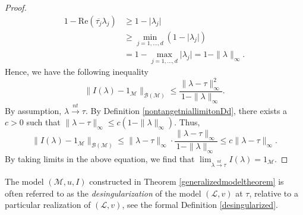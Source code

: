 \documentclass[11pt, reqno]{amsart}
\newcommand\1{\boldsymbol {1}}
\numberwithin{equation}{section}
\begin{document}
\begin{proof}
\begin{align*}
    1-\mathrm{Re}(\overline{\tau_{j}}\lambda_{j})&\geq 1-\lvert \lambda_{j} \rvert \\
    &\geq \min_{j=1,\hdots,d}(1-\lvert \lambda_{j}\rvert)\\
    &=1-\max_{j=1,\hdots,d}\lvert\lambda_{j}\rvert =1-\|\lambda\|_{\infty}.
\end{align*}
Hence, we have the following inequality
$$\|I(\lambda)-1_{\mathcal{M}}\|_{\mathcal{B(M)}}\leq \dfrac{\|\lambda-\tau\|^{2}_{\infty}}{1-\|\lambda\|_{\infty}}.$$
By assumption, $\lambda{\overset{nt}\rightarrow}\tau$. By Definition \ref{nontangetniallimitonDd}, there exists a $c>0$ such that $ \|\lambda - \tau \|_{\infty}\leq c ( 1 - \|\lambda\|_{\infty})$. Thus,
$$\|I(\lambda)-1_{\mathcal{M}}\|_{\mathcal{B(M)}}\leq \|\lambda-\tau\|_{\infty}\cdot\dfrac{\|\lambda-\tau\|_{\infty}}{1-\|\lambda\|_{\infty}}\leq  c \|\lambda-\tau\|_{\infty}.$$
By taking limits in the above equation, we find that $\lim_{\lambda{\overset{nt}\rightarrow}\tau}I(\lambda)=1_{\mathcal{M}}$.\end{proof}

The model $(\mathcal{M},u,I)$ constructed in Theorem \ref{generalizedmodeltheorem}
is often referred to as the {\em{desingularization}} of the model $(\mathcal{L},v)$ at $\tau$, relative to a particular realization of $(\mathcal{L},v)$, see the formal Definition \ref{desingularized}. 
\end{document}
